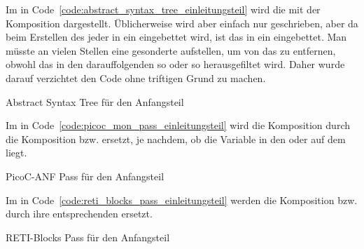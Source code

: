 Im  in Code~\ref{code:abstract_syntax_tree_einleitungsteil} wird die   mit der Komposition  dargestellt. Üblicherweise wird aber einfach nur  geschrieben, aber da beim Erstellen des  jeder  in ein  eingebettet wird, ist das  in ein  eingebettet. Man müsste an vielen Stellen eine gesonderte  aufstellen, um von  das  zu entfernen, obwohl das  in den darauffolgenden  so oder so herausgefiltet wird. Daher wurde darauf verzichtet den Code ohne triftigen Grund  zu machen.

\begin{code}
  \centering
  \caption{Abstract Syntax Tree für den Anfangsteil}
  \label{code:abstract_syntax_tree_einleitungsteil}
\end{code}

Im  in Code~\ref{code:picoc_mon_pass_einleitungsteil} wird die Komposition  durch die Komposition  bzw.  ersetzt, je nachdem, ob die Variable  in den  oder auf dem  liegt.

\begin{code}
  \centering
  \caption{PicoC-ANF Pass für den Anfangsteil}
  \label{code:picoc_mon_pass_einleitungsteil}
\end{code}

Im  in Code~\ref{code:reti_blocks_pass_einleitungsteil} werden die Komposition  bzw.  durch ihre entsprechenden  ersetzt.

\begin{code}
  \centering
  \caption{RETI-Blocks Pass für den Anfangsteil}
  \label{code:reti_blocks_pass_einleitungsteil}
\end{code}

